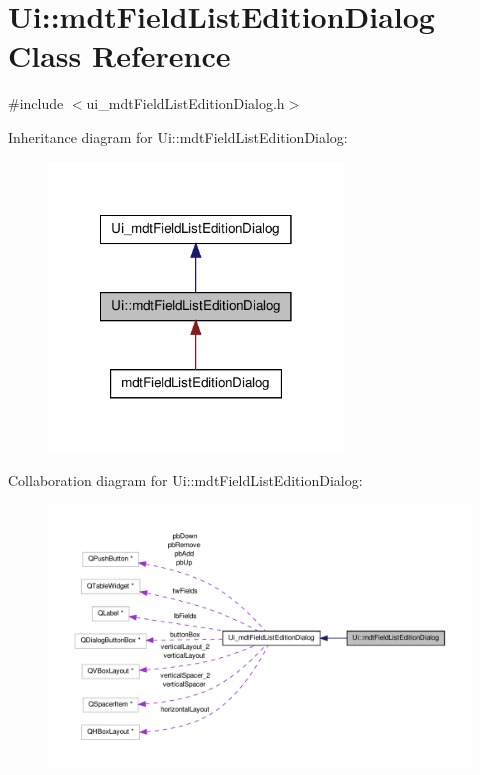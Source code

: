 \hypertarget{class_ui_1_1mdt_field_list_edition_dialog}{\section{Ui\-:\-:mdt\-Field\-List\-Edition\-Dialog Class Reference}
\label{class_ui_1_1mdt_field_list_edition_dialog}
}


{\ttfamily \#include $<$ui\-\_\-mdt\-Field\-List\-Edition\-Dialog.\-h$>$}



Inheritance diagram for Ui\-:\-:mdt\-Field\-List\-Edition\-Dialog\-:\nopagebreak
\begin{figure}[H]
\begin{center}
\leavevmode
\includegraphics[width=222pt]{class_ui_1_1mdt_field_list_edition_dialog__inherit__graph}
\end{center}
\end{figure}


Collaboration diagram for Ui\-:\-:mdt\-Field\-List\-Edition\-Dialog\-:\nopagebreak
\begin{figure}[H]
\begin{center}
\leavevmode
\includegraphics[width=350pt]{class_ui_1_1mdt_field_list_edition_dialog__coll__graph}
\end{center}
\end{figure}
